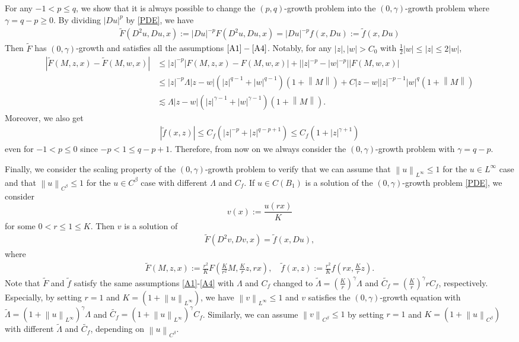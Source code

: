 \documentclass[reqno]{amsart}
\theoremstyle{plain}
\theoremstyle{definition}
\theoremstyle{remark}
\newcommand{\norm}[1]{\left\lVert#1\right\rVert}
\numberwithin{equation}{section}
\begin{document}
For any $-1<p\leq q$, we show that it is always possible to change the $(p,q)$-growth problem into the $(0,\gamma)$-growth problem where $\gamma=q-p\geq0$.
By dividing $|Du|^{p}$ by \eqref{PDE}, we have
\begin{align*}
    \tilde{F}(D^2u,Du,x):=|Du|^{-p}F(D^2u,Du,x)=|Du|^{-p}f(x,Du) :=\tilde{f}(x,Du)
\end{align*}
Then $\tilde{F}$ has $(0,\gamma)$-growth and satisfies all the assumptions $\ref{A1}-\ref{A4}$.
Notably, for any $|z|,|w| >C_0$ with $\frac{1}{2}|w|\leq |z| \leq 2|w|$,
\begin{align*}
    |\tilde{F}(M,z,x)-\tilde{F}(M,w,x)| &\leq |z|^{-p}|F(M,z,x)-F(M,w,x)| + ||z|^{-p}-|w|^{-p}||F(M,w,x)| \\
    &\leq|z|^{-p} \Lambda |z-w|(|z|^{q-1}+|w|^{q-1})(1+\norm{M}) + C|z-w||z|^{-p-1} |w|^q(1+\norm{M}) \\
    &\lesssim \Lambda|z-w|(|z|^{\gamma-1}+|w|^{\gamma-1})(1+\norm{M}).
\end{align*}
Moreover, we also get
\begin{align*}
    |\tilde{f}(x,z)| \leq C_f(|z|^{-p}+|z|^{q-p+1}) 
    \leq C_f(1+|z|^{\gamma+1})
\end{align*}
even for $-1<p\leq0$ since $-p<1\leq q-p+1$.
Therefore, from now on we always consider the $(0,\gamma)$-growth problem with $\gamma=q-p$.

Finally, we consider the scaling property of the $(0,\gamma)$-growth problem to verify that we can assume that $\norm{u}_{L^\infty} \leq 1$ for the $u \in L^\infty$ case and that $\norm{u}_{C^\beta} \leq 1$ for the $u \in C^\beta$ case with different $\Lambda$ and $C_f$.
If $u \in C(B_1)$ is a solution of the $(0,\gamma)$-growth problem \eqref{PDE}, we consider
$$v(x) := \frac{u(rx)}{K}$$
for some $0<r\leq1\leq K$.
Then $v$ is a solution of 
\begin{align*}
    \tilde{F}(D^2v,Dv,x)=\tilde{f}(x,Du),
\end{align*}
where \begin{align} \label{scaledPDE}
    \tilde{F}(M,z,x) := \frac{r^2}{K}F(\frac{K}{r^2}M,\frac{K}{r}z,rx), \quad \tilde{f}(x,z) :=\frac{r^2}{K}f(rx,\frac{K}{r}z).
\end{align}
Note that $\tilde{F}$ and $\tilde{f}$ satisfy the same assumptions \ref{A1}-\ref{A4} with $\Lambda$ and $C_f$ changed to $\tilde{\Lambda} = \left(\frac{K}{r}\right)^\gamma\Lambda$ and $\tilde{C_f}= \left(\frac{K}{r}\right)^\gamma rC_f$, respectively.
Especially, by setting $r=1$ and $K = (1+ \norm{u}_{L^\infty})$, we have $\norm{v}_{L^\infty} \leq 1$ and $v$ satisfies the $(0,\gamma)$-growth equation with $\tilde{\Lambda} = (1+\norm{u}_{L^\infty})^\gamma \Lambda$ and $\tilde{C_f}= (1+\norm{u}_{L^\infty})^\gamma C_f$.
Similarly, we can assume $\norm{v}_{C^\beta} \leq 1$ by setting $r=1$ and $K = (1+ \norm{u}_{C^\beta})$ with different $\tilde{\Lambda}$ and $\tilde{C_f}$, depending on $\norm{u}_{C^\beta}$.
\end{document}
